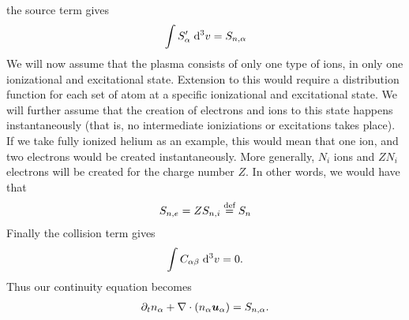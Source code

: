 %
the source term gives
%
\begin{align*}
    \int {S'_{\alpha}} \; \text{d} {^3v} = S_{n,\alpha}
\end{align*}
%
We will now assume that the plasma consists of only one type of ions, in only one ionizational and excitational state.
Extension to this would require a distribution function for each set of atom at a specific ionizational and excitational state.
We will further assume that the creation of electrons and ions to this state happens instantaneously (that is, no intermediate ioniziations or excitations takes place).
If we take fully ionized helium as an example, this would mean that one ion, and two electrons would be created instantaneously.
More generally, $N_i$ ions and $ZN_i$ electrons will be created for the charge number $Z$.
In other words, we would have that
%
\begin{align}
    S_{n,e}=ZS_{n,i}\overset{\text{def}}{=} S_n
    \label{eq:kinSource}
\end{align}
%
Finally the collision term gives
%
\begin{align*}
    \int {C_{\alpha\beta}} \; \text{d} {^3v} = 0.
\end{align*}
%
Thus our continuity equation becomes
%
\begin{align}
    \partial_t n_\alpha + \nabla\cdot\left(n_\alpha \boldsymbol{u}_\alpha\right) = S_{n,\alpha} \label{kin:cont}.
\end{align}

